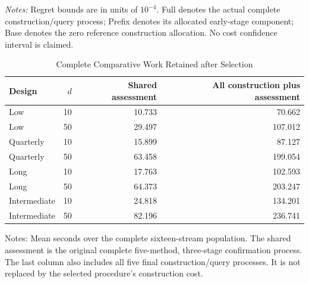 \noindent\textit{Notes:} Regret bounds are in units of $10^{-4}$. Full denotes the actual complete construction/query process; Prefix denotes its allocated early-stage component; Base denotes the zero reference construction allocation. No cost confidence interval is claimed.
\begin{table}[htbp]\centering\small
\caption{Complete Comparative Work Retained after Selection}\label{tab:r18bills}
\begin{tabular}{lrrr}\toprule Design & $d$ & Shared assessment & All construction plus assessment\\\midrule
Low & 10 & 10.733 & 70.662\\
Low & 50 & 29.497 & 107.012\\
Quarterly & 10 & 15.899 & 87.127\\
Quarterly & 50 & 63.458 & 199.054\\
Long & 10 & 17.763 & 102.593\\
Long & 50 & 64.373 & 203.247\\
Intermediate & 10 & 24.818 & 134.201\\
Intermediate & 50 & 82.196 & 236.741\\
\bottomrule\end{tabular}
\par\vspace{4pt}\begin{minipage}{.95\textwidth}\footnotesize Notes: Mean seconds over the complete sixteen-stream population. The shared assessment is the original complete five-method, three-stage confirmation process. The last column also includes all five final construction/query processes. It is not replaced by the selected procedure\textquoteright s construction cost.\end{minipage}\end{table}

